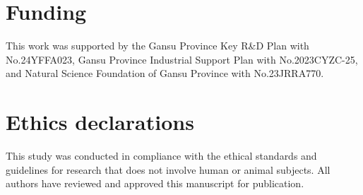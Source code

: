\documentclass[a4paper,fleqn]{cas-dc}
\begin{document}
\section*{Funding}
This work was supported by the Gansu Province Key R\&D  Plan with No.24YFFA023, Gansu Province Industrial Support Plan with No.2023CYZC-25,  and  Natural Science Foundation of Gansu Province with No.23JRRA770.   

\section*{Ethics declarations}
This study was conducted in compliance with the ethical standards and guidelines for research that does not involve human or animal subjects. All authors have reviewed and approved this manuscript for publication.




\end{document}
